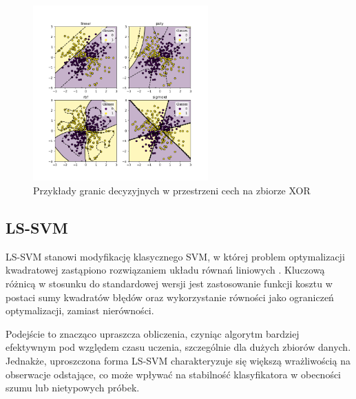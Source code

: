 \documentclass[a4paper,twoside,12pt]{book}
\begin{document}
\begin{figure}[!h]
	\centering
	\includegraphics[width=0.6\textwidth]{img/r3/kernels.png}
	\caption{Przykłady granic decyzyjnych w przestrzeni cech na zbiorze XOR\cite{sklearn_api}}
	\label{jadro_svm}
\end{figure}

\newpage
\subsection*{LS-SVM}
LS-SVM stanowi modyfikację klasycznego SVM, w której problem optymalizacji kwadratowej zastąpiono rozwiązaniem układu równań liniowych \cite{suykens2002}. Kluczową różnicą w stosunku do standardowej wersji jest zastosowanie funkcji kosztu w postaci sumy kwadratów błędów oraz wykorzystanie równości jako ograniczeń optymalizacji, zamiast nierówności.

Podejście to znacząco upraszcza obliczenia, czyniąc algorytm bardziej efektywnym pod względem czasu uczenia, szczególnie dla dużych zbiorów danych. Jednakże, uproszczona forma LS-SVM charakteryzuje się większą wrażliwością na obserwacje odstające, co może wpływać na stabilność klasyfikatora w obecności szumu lub nietypowych próbek.
\end{document}

